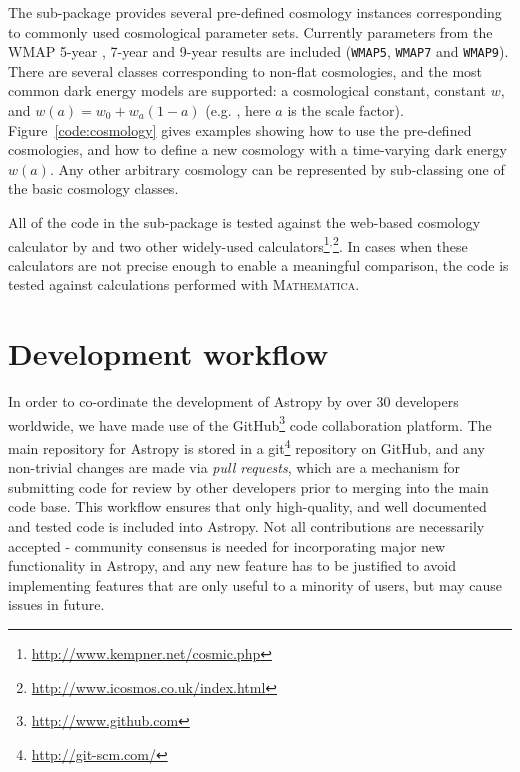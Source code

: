 \documentclass[traditabstract]{aa}
\begin{document}
The sub-package provides several pre-defined cosmology instances
corresponding to commonly used cosmological parameter sets. Currently
parameters from the WMAP 5-year \citep{Komatsu09}, 7-year
\citep{Komatsu11} and 9-year results \citep{Hinshaw13} are included
(\texttt{WMAP5}, \texttt{WMAP7} and \texttt{WMAP9}).  There are
several classes corresponding to non-flat cosmologies, and the most
common dark energy models are supported: a cosmological constant,
constant $w$, and $w(a) = w_0 + w_a (1-a)$ (e.g. \citealt{Linder03},
here $a$ is the scale factor). Figure~\ref{code:cosmology} gives
examples showing how to use the pre-defined cosmologies, and how to
define a new cosmology with a time-varying dark energy $w(a)$. Any
other arbitrary cosmology can be represented by sub-classing one of
the basic cosmology classes.

All of the code in the sub-package is tested against the web-based
cosmology calculator by \citet{Wright06} and two other widely-used
calculators\footnote{\url{http://www.kempner.net/cosmic.php}}$^,$\footnote{\url{http://www.icosmos.co.uk/index.html}}.
In cases when these calculators are not precise enough to enable a
meaningful comparison, the code is tested against calculations
performed with \textsc{Mathematica}.

\section{Development workflow}

\label{sec:workflow}



In order to co-ordinate the development of Astropy by over 30 developers
worldwide, we have made use of the
GitHub\footnote{\url{http://www.github.com}} code collaboration platform. The
main repository for Astropy is stored in a
git\footnote{\url{http://git-scm.com/}} repository on GitHub, and any
non-trivial changes are made via \textit{pull requests}, which are a mechanism
for submitting code for review by other developers prior to merging into the
main code base. This workflow ensures that only high-quality, and well
documented and tested code is included into Astropy. Not all contributions are
necessarily accepted - community consensus is needed for incorporating major
new functionality in Astropy, and any new feature has to be justified to avoid
implementing features that are only useful to a minority of users, but may
cause issues in future.
\end{document}
